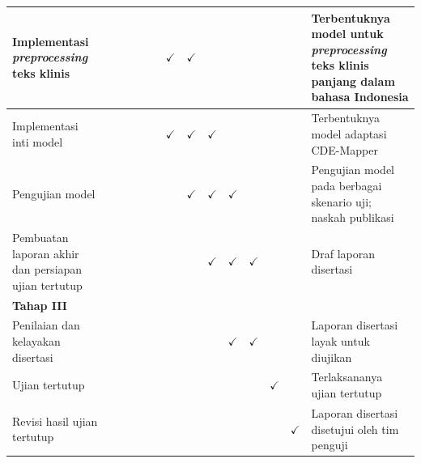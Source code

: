 \begin{table}[H]
{\begin{tabular}{>{\raggedright\arraybackslash}p{4.4cm} *{12}{c} >{\raggedright\arraybackslash}p{6.1cm}}
\midrule
Implementasi \textit{preprocessing} teks klinis & & & & & & $\checkmark$ & $\checkmark$ & & & & & & Terbentuknya model untuk \textit{preprocessing} teks klinis panjang dalam bahasa Indonesia \\
\midrule
Implementasi inti model & & & & & & $\checkmark$ & $\checkmark$ & $\checkmark$ & & & & & Terbentuknya model adaptasi CDE-Mapper \\
\midrule
Pengujian model & & & & & & & $\checkmark$ & $\checkmark$ & $\checkmark$ & & & & Pengujian model pada berbagai skenario uji; naskah publikasi \\
\midrule
Pembuatan laporan akhir dan persiapan ujian tertutup & & & & & & & & $\checkmark$ & $\checkmark$ & $\checkmark$ & & & Draf laporan disertasi \\
\midrule
\textbf{Tahap III} & & & & & & & & & & & & & \\
\midrule
Penilaian dan kelayakan disertasi & & & & & & & & & $\checkmark$ & $\checkmark$ & & & Laporan disertasi layak untuk diujikan \\
\midrule
Ujian tertutup & & & & & & & & & & & $\checkmark$ & & Terlaksananya ujian tertutup \\
\midrule
Revisi hasil ujian tertutup & & & & & & & & & & & & $\checkmark$ & Laporan disertasi disetujui oleh tim penguji \\
\bottomrule
\end{tabular}%
}
\normalsize
\end{table}